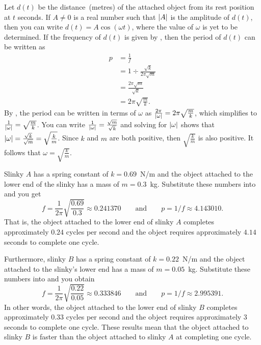\documentclass[a4paper,oneside,12pt]{article}
\begin{document}
\begin{problem}
{\begin{solution}
Let $d(t)$ be the distance~(metres) of the attached object from its
rest position at $t$ seconds.  If $A \neq 0$ is a real number such
that $\lvert A\rvert$ is the amplitude of $d(t)$, then you can
write $d(t) = A \cos(\omega t)$, where the value of $\omega$ is yet to
be determined.  If the frequency of $d(t)$ is given by
, then the period of
$d(t)$ can be written as
\begin{align*}
p
&=
\frac{1}{f} \\[4pt]
&=
1
\div
\frac{
  \sqrt{k}
}{
  2\pi \sqrt{m}
} \\[4pt]
&=
\frac{2\pi\sqrt{m}}{\sqrt{k}} \\[4pt]
&=
2\pi \sqrt{\frac{m}{k}}.
\end{align*}
By , the period can
be written in terms of $\omega$ as
$\frac{2\pi}{\lvert\omega\rvert} = 2\pi \sqrt{\frac{m}{k}}$, which
simplifies to
$\frac{1}{\lvert\omega\rvert} = \sqrt{\frac{m}{k}}$.  You can
write
$\frac{1}{\lvert\omega\rvert} = \frac{\sqrt{m}}{\sqrt{k}}$ and
solving for $\lvert\omega\rvert$ shows that
$\lvert\omega\rvert
=
\frac{\sqrt{k}}{\sqrt{m}} = \sqrt{\frac{k}{m}}$.  Since $k$ and $m$
are both positive, then $\sqrt{\frac{k}{m}}$ is also positive.  It
follows that $\omega = \sqrt{\frac{k}{m}}$.

Slinky $A$ has a spring constant of $k = 0.69$~N/m and the object
attached to the lower end of the slinky has a mass of $m = 0.3$~kg.
Substitute these numbers into
 and you get
\[
f
=
\frac{1}{2\pi}
\sqrt{
  \frac{0.69}{0.3}
}
\approx
0.241370
\qquad
\text{and}
\qquad
p
=
1 / f
\approx
4.143010.
\]
That is, the object attached to the lower end of slinky $A$ completes
approximately $0.24$ cycles per second and the object requires
approximately $4.14$ seconds to complete one cycle.

Furthermore, slinky $B$ has a spring constant of $k = 0.22$~N/m and
the object attached to the slinky's lower end has a mass of
$m = 0.05$~kg.  Substitute these numbers into
 and you obtain
\[
f
=
\frac{1}{2\pi}
\sqrt{
  \frac{0.22}{0.05}
}
\approx
0.333846
\qquad
\text{and}
\qquad
p
=
1 / f
\approx
2.995391.
\]
In other words, the object attached to the lower end of slinky $B$
completes approximately $0.33$ cycles per second and the object
requires approximately $3$ seconds to complete one cycle.  These
results mean that the object attached to slinky $B$ is faster than the
object attached to slinky $A$ at completing one cycle.


\end{solution}}
\end{problem}
\end{document}
